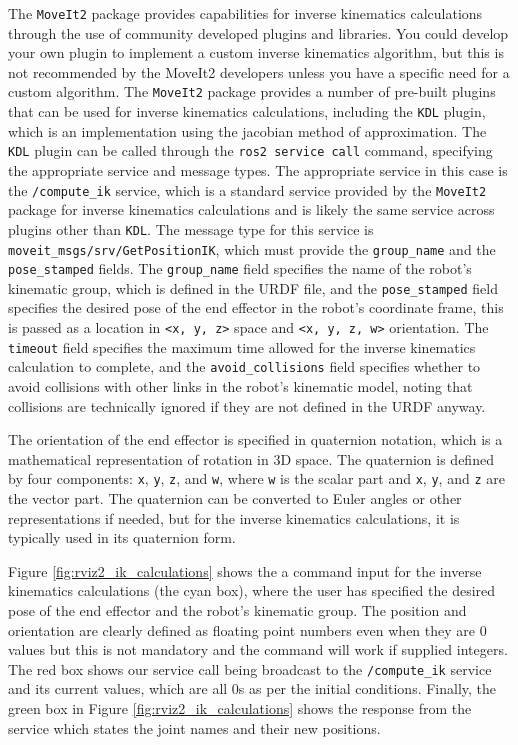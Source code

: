 \documentclass[10pt,a4paper,english]{article}
\begin{document}
The \texttt{MoveIt2} package provides capabilities for inverse kinematics calculations through the use of community developed plugins and libraries. You could develop your own plugin to implement a custom inverse kinematics algorithm, but this is not recommended by the MoveIt2 developers unless you have a specific need for a custom algorithm. The \texttt{MoveIt2} package provides a number of pre-built plugins that can be used for inverse kinematics calculations, including the \texttt{KDL} plugin, which is an implementation using the jacobian method of approximation.
The \texttt{KDL} plugin can be called through the \texttt{ros2 service call} command, specifying the appropriate service and message types. The appropriate service in this case is the \texttt{/compute\_ik} service, which is a standard service provided by the \texttt{MoveIt2} package for inverse kinematics calculations and is likely the same service across plugins other than \texttt{KDL}. The message type for this service is \texttt{moveit\_msgs/srv/GetPositionIK}, which must provide the \texttt{group\_name} and the \texttt{pose\_stamped} fields. The \texttt{group\_name} field specifies the name of the robot's kinematic group, which is defined in the URDF file, and the \texttt{pose\_stamped} field specifies the desired pose of the end effector in the robot's coordinate frame, this is passed as a location in \texttt{<x, y, z>} space and \texttt{<x, y, z, w>} orientation. The \texttt{timeout} field specifies the maximum time allowed for the inverse kinematics calculation to complete, and the \texttt{avoid\_collisions} field specifies whether to avoid collisions with other links in the robot's kinematic model, noting that collisions are technically ignored if they are not defined in the URDF anyway. \par

The orientation of the end effector is specified in quaternion notation, which is a mathematical representation of rotation in 3D space. The quaternion is defined by four components: \texttt{x}, \texttt{y}, \texttt{z}, and \texttt{w}, where \texttt{w} is the scalar part and \texttt{x}, \texttt{y}, and \texttt{z} are the vector part. The quaternion can be converted to Euler angles or other representations if needed, but for the inverse kinematics calculations, it is typically used in its quaternion form. \par

Figure \ref{fig:rviz2_ik_calculations} shows the a command input for the inverse kinematics calculations (the cyan box), where the user has specified the desired pose of the end effector and the robot's kinematic group. The position and orientation are clearly defined as floating point numbers even when they are 0 values but this is not mandatory and the command will work if supplied integers. The red box shows our service call being broadcast to the \texttt{/compute\_ik} service and its current values, which are all 0s as per the initial conditions. Finally, the green box in Figure \ref{fig:rviz2_ik_calculations} shows the response from the service which states the joint names and their new positions.
\end{document}
